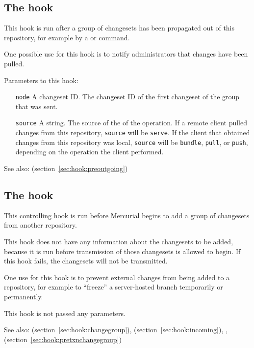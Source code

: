 \subsection{The  hook}
\label{sec:hook:outgoing}

This hook is run after a group of changesets has been propagated out
of this repository, for example by a  or 
command.

One possible use for this hook is to notify administrators that
changes have been pulled.

Parameters to this hook:
\begin{itemize}
\item[\texttt{node}] A changeset ID.  The changeset ID of the first
  changeset of the group that was sent.
\item[\texttt{source}] A string.  The source of the of the operation.
  If a remote client pulled changes from this repository,
  \texttt{source} will be \texttt{serve}.  If the client that obtained
  changes from this repository was local, \texttt{source} will be
  \texttt{bundle}, \texttt{pull}, or \texttt{push}, depending on the
  operation the client performed.
\end{itemize}

See also:  (section~\ref{sec:hook:preoutgoing})

\subsection{The  hook}
\label{sec:hook:prechangegroup}

This controlling hook is run before Mercurial begins to add a group of
changesets from another repository.

This hook does not have any information about the changesets to be
added, because it is run before transmission of those changesets is
allowed to begin.  If this hook fails, the changesets will not be
transmitted.

One use for this hook is to prevent external changes from being added
to a repository, for example to ``freeze'' a server-hosted branch
temporarily or permanently.

This hook is not passed any parameters.

See also:  (section~\ref{sec:hook:changegroup}),
 (section~\ref{sec:hook:incoming}), ,
 (section~\ref{sec:hook:pretxnchangegroup})

